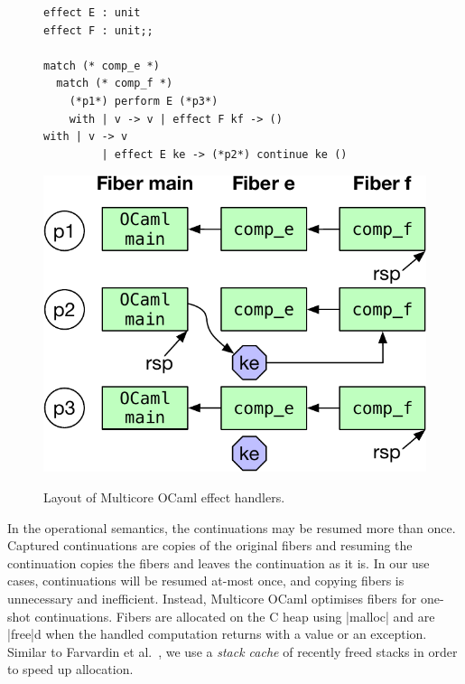 \documentclass[sigplan,screen]{acmart}
\begin{document}
\begin{figure}
\begin{minipage}{0.64\linewidth}
\begin{minipage}{\linewidth}
    \label{fig:mcstack}
  \end{minipage}
  \begin{minipage}{0.55\linewidth}
		\vspace{1mm}
    \begin{lstlisting}
effect E : unit
effect F : unit;;

match (* comp_e *)
  match (* comp_f *)
    (*p1*) perform E (*p3*)
	with | v -> v | effect F kf -> ()
with | v -> v
		 | effect E ke -> (*p2*) continue ke ()
    \end{lstlisting}
		\label{code:effimpl}
  \end{minipage}
  \begin{minipage}{0.44\linewidth}
		\vspace{2mm}
    \centering
    \includegraphics[scale=0.42]{figures/fiber_handler}
    \label{fig:fiber_handler}
  \end{minipage}
\end{minipage}
\caption{Layout of Multicore OCaml effect handlers.}
\end{figure}

In the operational semantics, the continuations may be resumed more than once.
Captured continuations are copies of the original fibers and resuming the
continuation copies the fibers and leaves the continuation as it is. In our use
cases, continuations will be resumed at-most once, and copying fibers is
unnecessary and inefficient. Instead, Multicore OCaml optimises fibers for
one-shot continuations. Fibers are allocated on the C heap using |malloc| and
are |free|d when the handled computation returns with a value or an exception.
Similar to Farvardin et al.~\cite{Farvardin20}, we use a \emph{stack cache} of
recently freed stacks in order to speed up allocation.
\end{document}
